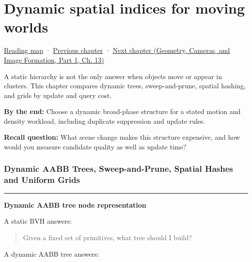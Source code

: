 \chapter{Dynamic spatial indices for moving worlds}\label{06-engine-ii-ch029-dynamic-spatial-indices-for-moving-worlds}\hypertarget{06-engine-ii-ch029}{}\label{stagechapter:06-engine-ii-ch029}

\hypertarget{06-engine-ii-ch029-dynamic-spatial-indices-for-moving-worlds}{}

\hyperref[volume-reading-map]{Reading map} · \hyperref[06-engine-ii-ch028-bvh-traversal-refitting-and-simd]{Previous chapter} · \href{../03-Geometry-Cameras-and-Image-Formation-P01/main.pdf\#nameddest=06-engine-ii-ch030-depth-projection-and-shadow-map-precision}{Next chapter (Geometry, Cameras, and Image Formation, Part 1, Ch. 13)}

A static hierarchy is not the only answer when objects move or appear in clusters. This chapter compares dynamic trees, sweep-and-prune, spatial hashing, and grids by update and query cost.

\textbf{By the end:} Choose a dynamic broad-phase structure for a stated motion and density workload, including duplicate suppression and update rules.

\textbf{Recall question:} What scene change makes this structure expensive, and how would you measure candidate quality as well as update time?

\subsection{Dynamic AABB Trees, Sweep-and-Prune, Spatial Hashes and Uniform Grids}\label{06-engine-ii-ch029-dynamic-aabb-trees-sweep-and-prune-spatial-hashes-and-uniform-grids}

\hypertarget{06-engine-ii-ch029-dynamic-aabb-trees-sweep-and-prune-spatial-hashes-and-uniform-grids}{}

\begin{center}\rule{0.5\linewidth}{0.5pt}\end{center}

\textbf{Dynamic AABB tree node representation}

A static BVH answers:

\begin{quote}
Given a fixed set of primitives, what tree should I build?
\end{quote}

A dynamic AABB tree answers:


